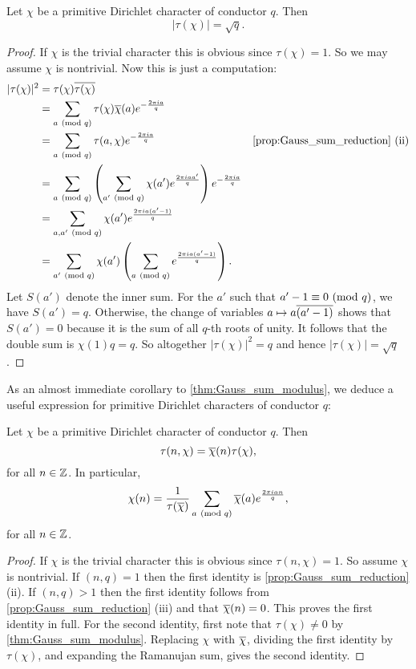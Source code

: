       \begin{theorem}\label{thm:Gauss_sum_modulus}
        Let $\chi$ be a primitive Dirichlet character of conductor $q$. Then
        \[
          |\tau(\chi)| = \sqrt{q}.
        \]
      \end{theorem}
      \begin{proof}
        If $\chi$ is the trivial character this is obvious since $\tau(\chi) = 1$. So we may assume $\chi$ is nontrivial. Now this is just a computation:
        \begin{align*}
          |\tau(\chi)|^{2} &= \tau(\chi)\conj{\tau(\chi)} \\
          &= \sum_{a \tmod{q}}\tau(\chi)\cchi(a)e^{-\frac{2\pi ia}{q}} \\
          &=  \sum_{a \tmod{q}}\tau(a,\chi)e^{-\frac{2\pi ia}{q}} & \text{\cref{prop:Gauss_sum_reduction} (ii)} \\
          &= \sum_{a \tmod{q}}\left(\sum_{a' \tmod{q}}\chi(a')e^{\frac{2\pi iaa'}{q}}\right)e^{-\frac{2\pi ia}{q}} \\
          &= \sum_{a,a' \tmod{q}}\chi(a')e^{\frac{2\pi ia(a'-1)}{q}} \\
          &= \sum_{a' \tmod{q}}\chi(a')\left(\sum_{a \tmod{q}}e^{\frac{2\pi ia(a'-1)}{q}}\right).
        \end{align*}
        Let $S(a')$ denote the inner sum. For the $a'$ such that $a'-1 \equiv 0 \ (\mathrm{mod}\text{ }q)$, we have $S(a') = q$. Otherwise, the change of variables $a \mapsto a\overline{(a'-1)}$ shows that $S(a') = 0$ because it is the sum of all $q$-th roots of unity. It follows that the double sum is $\chi(1)q = q$. So altogether $|\tau(\chi)|^{2} = q$ and hence $|\tau(\chi)| = \sqrt{q}$.
      \end{proof}

      As an almost immediate corollary to \cref{thm:Gauss_sum_modulus}, we deduce a useful expression for primitive Dirichlet characters of conductor $q$:

      \begin{corollary}\label{cor:gauss_sum_primitive_formula}
        Let $\chi$ be a primitive Dirichlet character of conductor $q$. Then
        \[
          \tau(n,\chi) = \overline{\chi}(n)\tau(\chi),
        \]
        for all $n \in \mathbb{Z}$. In particular,
        \[
          \chi(n) = \frac{1}{\tau(\overline{\chi})}\sum_{a \ (\mathrm{mod}\text{ }q)}\overline{\chi}(a)e^{\frac{2\pi ian}{q}},
        \]
        for all $n \in \mathbb{Z}$.
      \end{corollary}
      \begin{proof}
        If $\chi$ is the trivial character this is obvious since $\tau(n,\chi) = 1$. So assume $\chi$ is nontrivial. If $(n,q) = 1$ then the first identity is \cref{prop:Gauss_sum_reduction} (ii). If $(n,q) > 1$ then the first identity follows from \cref{prop:Gauss_sum_reduction} (iii) and that $\overline{\chi}(n) = 0$. This proves the first identity in full. For the second identity, first note that $\tau(\chi) \neq 0$ by \cref{thm:Gauss_sum_modulus}. Replacing $\chi$ with $\overline{\chi}$, dividing the first identity by $\tau(\chi)$, and expanding the Ramanujan sum, gives the second identity.
      \end{proof}

